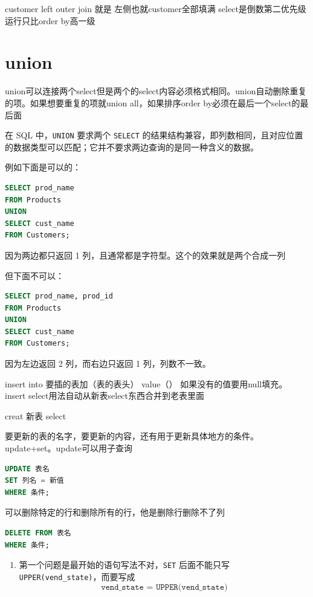 \begin{example}
\begin{note}
\end{note}
customer left outer join 就是
左侧也就customer全部填满
select是倒数第二优先级运行只比order by高一级
\section{union}
\begin{dxtips}
    union可以连接两个select但是两个的select内容必须格式相同。union自动删除重复的项。如果想要重复的项就union all，如果排序order by必须在最后一个select的最后面
\end{dxtips}
\begin{example}
在 SQL 中，\texttt{UNION} 要求两个 \texttt{SELECT} 的结果结构兼容，即列数相同，且对应位置的数据类型可以匹配；它并不要求两边查询的是同一种含义的数据。

例如下面是可以的：
\begin{lstlisting}[language=SQL]
SELECT prod_name
FROM Products
UNION
SELECT cust_name
FROM Customers;
\end{lstlisting}

因为两边都只返回 1 列，且通常都是字符型。这个的效果就是两个合成一列

但下面不可以：
\begin{lstlisting}[language=SQL]
SELECT prod_name, prod_id
FROM Products
UNION
SELECT cust_name
FROM Customers;
\end{lstlisting}

因为左边返回 2 列，而右边只返回 1 列，列数不一致。
\end{example}
\begin{dxtips}
    insert into 要插的表加（表的表头） value（）
    如果没有的值要用null填充。
    insert select用法自动从新表select东西合并到老表里面
\end{dxtips}
creat 新表 select
\begin{dxtips}[update]
    要更新的表的名字，要更新的内容，还有用于更新具体地方的条件。update+set。update可以用子查询
\end{dxtips}
\begin{lstlisting}[language=SQL]
UPDATE 表名
SET 列名 = 新值
WHERE 条件;
\end{lstlisting}
\begin{dxtips}[delete]
    可以删除特定的行和删除所有的行，他是删除行删除不了列
\end{dxtips}
 \begin{lstlisting}[language=SQL]
DELETE FROM 表名
WHERE 条件;
\end{lstlisting}\begin{enumerate}
    \item 第一个问题是最开始的语句写法不对，\texttt{SET} 后面不能只写 \texttt{UPPER(vend\_state)}，而要写成
    \[
    \texttt{vend\_state = UPPER(vend\_state)}
    \]


\end{enumerate}
\end{example}

